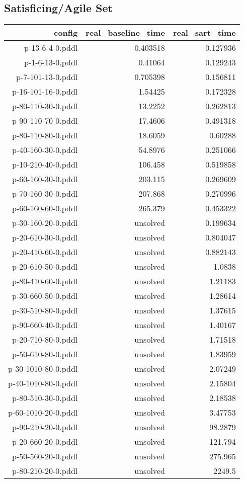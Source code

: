 \documentclass{article}
\begin{document}
                    \subsection*{Satisficing/Agile Set}
                    
                            \begin{center}
                            \scriptsize
                            \begin{tabular}{r|r|r}
                            config & real\_baseline\_time & real\_sart\_time\\\midrule
                             p-13-6-4-0.pddl&0.403518&0.127936\\
 p-1-6-13-0.pddl&0.41064&0.129243\\
 p-7-101-13-0.pddl&0.705398&0.156811\\
 p-16-101-16-0.pddl&1.54425&0.172328\\
 p-80-110-30-0.pddl&13.2252&0.262813\\
 p-90-110-70-0.pddl&17.4606&0.491318\\
 p-80-110-80-0.pddl&18.6059&0.60288\\
 p-40-160-30-0.pddl&54.8976&0.251066\\
 p-10-210-40-0.pddl&106.458&0.519858\\
 p-60-160-30-0.pddl&203.115&0.269609\\
 p-70-160-30-0.pddl&207.868&0.270996\\
 p-60-160-60-0.pddl&265.379&0.453322\\
 p-30-160-20-0.pddl&unsolved&0.199634\\
 p-20-610-30-0.pddl&unsolved&0.804047\\
 p-20-410-60-0.pddl&unsolved&0.882143\\
 p-20-610-50-0.pddl&unsolved&1.0838\\
 p-80-410-60-0.pddl&unsolved&1.21183\\
 p-30-660-50-0.pddl&unsolved&1.28614\\
 p-30-510-80-0.pddl&unsolved&1.37615\\
 p-90-660-40-0.pddl&unsolved&1.40167\\
 p-20-710-80-0.pddl&unsolved&1.71518\\
 p-50-610-80-0.pddl&unsolved&1.83959\\
 p-30-1010-80-0.pddl&unsolved&2.07249\\
 p-40-1010-80-0.pddl&unsolved&2.15804\\
 p-80-510-30-0.pddl&unsolved&2.18538\\
 p-60-1010-20-0.pddl&unsolved&3.47753\\
 p-90-210-20-0.pddl&unsolved&98.2879\\
 p-20-660-20-0.pddl&unsolved&121.794\\
 p-50-560-20-0.pddl&unsolved&275.965\\
 p-80-210-20-0.pddl&unsolved&2249.5
                            \end{tabular}
                            \end{center}
                    
\end{document}
